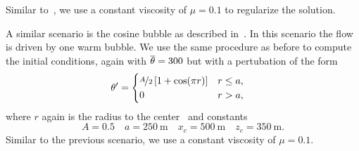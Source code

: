Similar to~\cite{muller2010adaptive}, we use a constant viscosity of $\mu = 0.1$ to regularize the solution.

A similar scenario is the cosine bubble as described in~\cite{giraldo2008study}.
In this scenario the flow is driven by one warm bubble.
We use the same procedure as before to compute the initial conditions, again with $\overline{\theta} = 300$ but with a pertubation of the form
\begin{align}
  \label{eq:cos-pertubation}
  \theta' &= \begin{cases}
    \nicefrac{A}{2} \left[ 1 + \cos(\pi r) \right] & r \leq a, \\
    0 & r > a,
    \end{cases}
\end{align}
where $r$ again is the radius to the center~ and constants
\begin{equation}\label{eq:density-bubble}
  A = 0.5 \quad a = \SI{250}{\m} \quad x_c = \SI{500}{\m} \quad z_c = \SI{350}{\m}.
\end{equation}
Similar to the previous scenario, we use a constant viscosity of $\mu = 0.1$.

